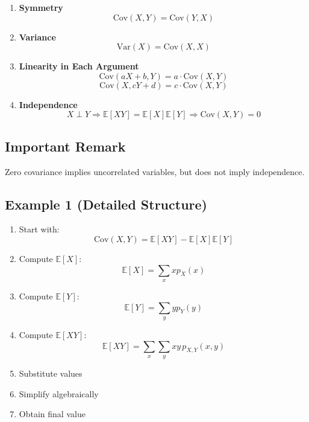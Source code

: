 \documentclass[12pt]{article}
\begin{document}
\begin{enumerate}
    \item \textbf{Symmetry}
    \[
    \text{Cov}(X,Y) = \text{Cov}(Y,X)
    \]

    \item \textbf{Variance}
    \[
    \text{Var}(X) = \text{Cov}(X,X)
    \]

    \item \textbf{Linearity in Each Argument}
    \[
    \text{Cov}(aX + b, Y) = a \cdot \text{Cov}(X,Y)
    \]
    \[
    \text{Cov}(X, cY + d) = c \cdot \text{Cov}(X,Y)
    \]

    \item \textbf{Independence}
    \[
    X \perp Y \Rightarrow \mathbb{E}[XY] = \mathbb{E}[X]\mathbb{E}[Y]
    \Rightarrow \text{Cov}(X,Y) = 0
    \]
\end{enumerate}

\subsection{Important Remark}

Zero covariance implies uncorrelated variables, but does not imply independence.

\subsection{Example 1 (Detailed Structure)}

\begin{enumerate}
    \item Start with:
    \[
    \text{Cov}(X,Y) = \mathbb{E}[XY] - \mathbb{E}[X]\mathbb{E}[Y]
    \]

    \item Compute $\mathbb{E}[X]$:
    \[
    \mathbb{E}[X] = \sum_x x p_X(x)
    \]

    \item Compute $\mathbb{E}[Y]$:
    \[
    \mathbb{E}[Y] = \sum_y y p_Y(y)
    \]

    \item Compute $\mathbb{E}[XY]$:
    \[
    \mathbb{E}[XY] = \sum_x \sum_y xy\, p_{X,Y}(x,y)
    \]

    \item Substitute values

    \item Simplify algebraically

    \item Obtain final value
\end{enumerate}
\end{document}
